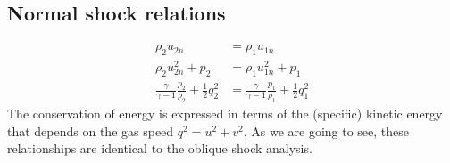 \documentclass[class=report, crop=false, 12pt,a4paper]{standalone}
\begin{document}
\subsection{Normal shock relations}
\begin{align}
    \rho_2 u_{2n}                                                   & = \rho_1 u_{1n}                                                   \\
    \rho_2 u^2_{2n} + p_2                                           & = \rho_1 u^2_{1n} + p_1                                           \\
    \frac{\gamma}{\gamma - 1}\frac{p_2}{\rho_2} + \frac{1}{2} q^2_2 & = \frac{\gamma}{\gamma - 1} \frac{p_1}{\rho_1} + \frac{1}{2}q^2_1
\end{align}
The conservation of energy is expressed in terms of the (specific) kinetic energy that depends on the gas speed $q^2 = u^2 + v^2$. As we are going to see, these relationships are identical to the oblique shock analysis.
\end{document}
